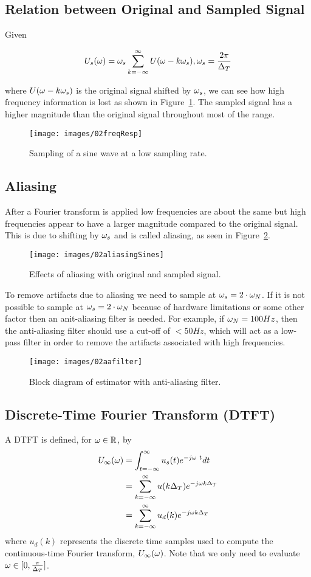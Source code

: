 \subsection{Relation between Original and Sampled Signal}
Given

\begin{equation*}
U_s(\omega) = \omega_s \sum_{k=-\infty}^\infty U(\omega-k\omega_s), \omega_s = \frac{2\pi}{\Delta_T}
\end{equation*}

where $U(\omega-k\omega_s)$ is the original signal shifted by $\omega_s$, we can see how high frequency information is lost as shown in Figure~\ref{fig:02freqResp}.
The sampled signal has a higher magnitude than the original signal throughout most of the range.
\begin{figure}[ht!]
\centering
\texttt{[image: images/02freqResp]}
\caption{Sampling of a sine wave at a low sampling rate.}%
\label{fig:02freqResp}
\end{figure}

\subsection{Aliasing}
After a Fourier transform is applied low frequencies are about the same but high frequencies appear to have a larger magnitude compared to the original signal.
This is due to shifting by $\omega_s$ and is called aliasing, as seen in Figure~\ref{fig:02aliasingSines}.
\begin{figure}[ht!]
\centering
\texttt{[image: images/02aliasingSines]}
\caption{Effects of aliasing with original and sampled signal.}%
\label{fig:02aliasingSines}
\end{figure}

To remove artifacts due to aliasing we need to sample at $\omega_s = 2\cdot\omega_N$.
If it is not possible to sample at $\omega_s = 2\cdot\omega_N$ because of hardware limitations or some other factor then an anit-aliasing filter is needed.
For example, if $\omega_N = 100 Hz$, then the anti-aliasing filter should use a cut-off of $< 50 Hz$, which will act as a low-pass filter in order to remove the artifacts associated with high frequencies.
\begin{figure}[ht!]
\centering
\texttt{[image: images/02aafilter]}
\caption{Block diagram of estimator with anti-aliasing filter.}%
\label{fig:02aafilter}
\end{figure}

\subsection{Discrete-Time Fourier Transform (DTFT)}
A DTFT is defined, for $\omega\in\mathbb{R}$, by
\begin{align*}
U_\infty(\omega) &= \int_{t=-\infty}^\infty u_s(t)e^{-j\omega\ t} dt \\
&= \sum_{k=-\infty}^\infty u(k\Delta_T) e^{-j\omega k\Delta_T} \\
&= \sum_{k=-\infty}^\infty u_d(k) e^{-j\omega k\Delta_T}
\end{align*}
where $u_d(k)$ represents the discrete time samples used to compute the continuous-time Fourier transform, $U_\infty(\omega)$.
Note that we only need to evaluate $\omega\in[0, \frac{\pi}{\Delta_T}]$.

